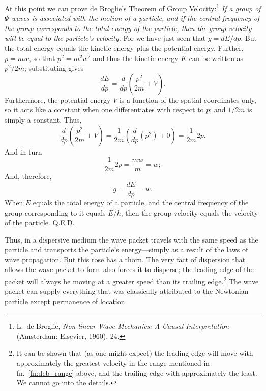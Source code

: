 At this point we can prove de Broglie's Theorem of Group
Velocity:\footnote{L.\ de Broglie, \emph{Non-linear Wave Mechanics: A
  Causal Interpretation} (Amsterdam: Elsevier, 1960), 24.}
\emph{If a group of $\Psi$ waves is associated with the motion of a particle,
and if the central frequency of the group corresponds to the total
energy of the particle, then the group-velocity will be equal to the
particle's velocity.} For we have just seen that $g = dE/dp$. But the total 
energy equals the kinetic energy plus the
potential energy. Further, $p = mw$, so that
$p^2 = m^2w^2$ and thus the kinetic
energy $K$ can be written as $p^2/2m$;
substituting gives
\begin{equation*}
\frac{dE}{dp} = \frac{d}{dp}\left(\frac{p^2}{2m} + V\right).
\end{equation*}
Furthermore, the potential energy $V$ is a function of the spatial
coordinates only, so it acts like a constant when one differentiates
with respect to $p$; and $1/2m$ is simply a constant. Thus,
\begin{equation*}
\frac{d}{dp}\left(\frac{p^2}{2m}+V\right) = \frac{1}{2m}\left(\frac{d}{dp}(p^2)+0\right) = \frac{1}{2m}2p.
\end{equation*}
And in turn
\begin{equation*}
\frac{1}{2m}2p = \frac{mw}{m} = w ;
\end{equation*}
And, therefore,
\begin{equation*}
g = \frac{dE}{dp} = w.
\end{equation*}
When $E$ equals the total energy of a particle, and the central
frequency of the group corresponding to it equals $E/h$, then the
group velocity equals the velocity of the particle. Q.E.D.

Thus, in a dispersive medium the wave packet travels with the same speed
as the particle and transports the particle's energy---simply as a
result of the laws of wave propagation. But this rose has a thorn. The
very fact of dispersion that allows the wave packet to form also forces
it to disperse; the leading edge of the packet will always be moving at
a greater speed than its trailing edge.\footnote{It can be shown that
  (as one might expect) the leading edge will move with approximately
  the greatest velocity in the range mentioned in fn.~\ref{fn:deb_range} above, and the
  trailing edge with approximately the least. We cannot go into the
  details.} The wave packet can supply everything that was classically
attributed to the Newtonian particle except permanence of location.

